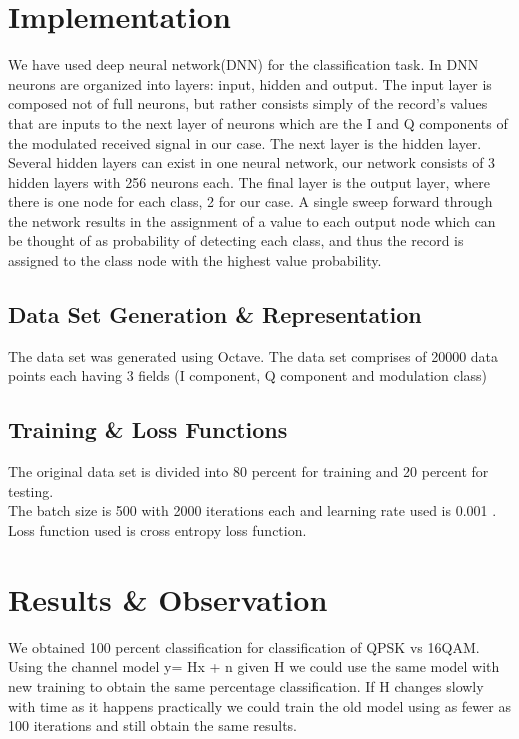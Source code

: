 \newpage
\section{Implementation}
We have used deep neural network(DNN) for the classification task. In DNN neurons are organized into layers: input, hidden and output. The input layer is composed not of full neurons, but rather consists simply of the record's values that are inputs to the next layer of neurons which are the I and Q components of the modulated received signal in our case. The next layer is the hidden layer. Several hidden layers can exist in one neural network, our network consists of 3 hidden layers with 256 neurons each. The final layer is the output layer, where there is one node for each class, 2 for our case. A single sweep forward through the network results in the assignment of a value to each output node which can be thought of as probability of detecting each class, and thus the record is assigned to the class node with the highest value probability. 

\subsection{Data Set Generation \& Representation}
The data set was generated using Octave. The data set comprises of 20000 data points each having 3 fields (I component, Q component and modulation class)

\subsection{Training \& Loss Functions}
The original data set is divided into 80 percent for training and 20 percent for testing. \\
The batch size is 500 with 2000 iterations each and learning rate used is 0.001 .\\
Loss function used is cross entropy loss function. 

\newpage
\section{Results \& Observation}
We obtained 100 percent classification for classification of QPSK vs 16QAM. \\ 
Using the channel model y= Hx + n given H we could use the same model with new training to obtain the same percentage classification. If H changes slowly with time as it happens practically we could train the old model using as fewer as 100 iterations and still obtain the same results.



